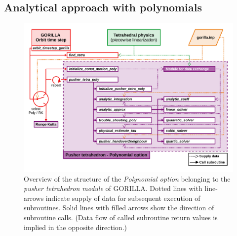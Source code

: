 \documentclass{TheMartianReport}
\begin{document}
\subsection{Analytical approach with polynomials}
%
\begin{figure}[h]
	\centerline{\includegraphics[keepaspectratio,width=1.05\linewidth, trim=0 20 0 20, clip]{figures/flow_diagram_GORILLA_02.pdf}}
	\captionsetup{justification=raggedright,singlelinecheck=false,textfont=footnotesize,labelfont=footnotesize}
	\caption{Overview of the structure of the \textit{Polynomial option} belonging to the \textit{pusher tetrahedron module} of GORILLA. Dotted lines with line-arrows indicate supply of data for subsequent execution of subroutines. Solid lines with filled arrows show the direction of subroutine calls. (Data flow of called subroutine return values is implied in the opposite direction.)}
	\label{fig:flow_diagram_GORILLA_02}
\end{figure}
\end{document}

